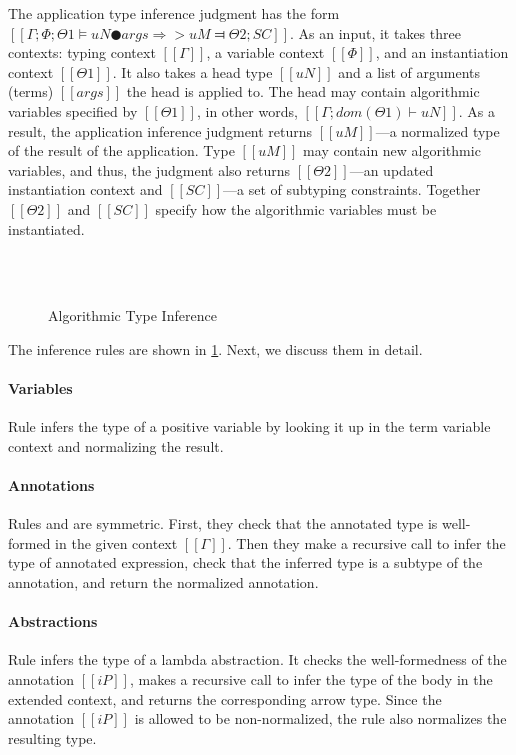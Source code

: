 The application type inference judgment has the form 
$[[Γ ; Φ ; Θ1 ⊨ uN ● args ⇒> uM ⫤ Θ2 ; SC]]$.
As an input, it takes three contexts: typing context $[[Γ]]$, a variable context $[[Φ]]$,
and an instantiation context $[[Θ1]]$. It also takes a head type $[[uN]]$ and 
a list of arguments (terms) $[[args]]$ the head is applied to.
The head may contain algorithmic variables specified by $[[Θ1]]$, 
in other words, $[[Γ; dom(Θ1) ⊢ uN]]$.
As a result, the application inference judgment returns 
$[[uM]]$---a normalized type of the result of the application.
Type $[[uM]]$ may contain new algorithmic variables, and thus, 
the judgment also returns $[[Θ2]]$---an updated instantiation context
and $[[SC]]$---a set of subtyping constraints.
Together $[[Θ2]]$ and $[[SC]]$ specify how the algorithmic variables 
must be instantiated.


\begin{figure}[t!]
  \ottdefnATPInfLabeled{}
  \hfill \\
  \ottdefnATNInfLabeled{}
  \hfill \\
  \ottdefnATSpinInfLabeled{}
  \caption{Algorithmic Type Inference}
  \label{fig:type-inference}
\end{figure}


The inference rules are shown in
\cref{fig:type-inference}.
Next, we discuss them in detail.

\paragraph*{Variables}
  Rule  
  infers the type of a positive variable by looking it up in the 
  term variable context and normalizing the result.

\paragraph*{Annotations}
  Rules  and 
  are symmetric.
  First, they check that the annotated type is well-formed in the 
  given context $[[Γ]]$. Then they make a recursive call to infer the 
  type of annotated expression, check that the inferred type is a subtype of 
  the annotation, and return the normalized annotation.

\paragraph*{Abstractions}
  Rule  infers the type of a lambda abstraction.
  It checks the well-formedness of the annotation $[[iP]]$,
  makes a recursive call to infer the type of the body in the extended context, 
  and returns the corresponding arrow type.
  Since the annotation $[[iP]]$ is allowed to be non-normalized,
  the rule also normalizes the resulting type.

